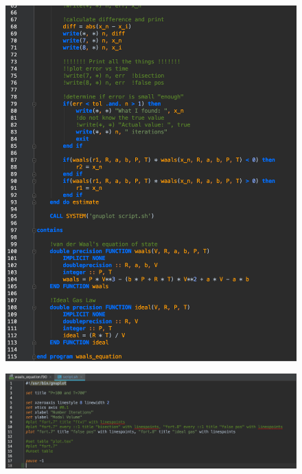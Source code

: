 \documentclass[12pt, letterpaper]{article}
\begin{document}
		\begin{figure}[h]
			\centering
			\includegraphics[width=\linewidth]{fortrancode3.png}
		\end{figure}
		\begin{figure}[h]
			\centering
			\includegraphics[width=\linewidth]{gnuplotscript.png}
		\end{figure}
\end{document}
